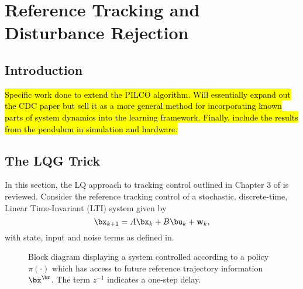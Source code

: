 \chapter{Reference Tracking and Disturbance Rejection}

\section{Introduction}
\hl{Specific work done to extend the PILCO algorithm. Will essentially expand out the CDC paper but sell it as a more general method for incorporating known parts of system dynamics into the learning framework. Finally, include the results from the pendulum in simulation and hardware.}


\section{The LQG Trick}
In this section, the LQ approach to tracking control outlined in Chapter 3 of \cite{BGW90} is reviewed. Consider the reference tracking control of a stochastic, discrete-time, Linear Time-Invariant (LTI) system given by 
\begin{equation}
\bx_{k+1} = A\bx_k + B\bu_k + \mathbf{w}_k,
\end{equation}
with state, input and noise terms as defined in. 

\begin{figure}[] %
\centering

\caption{Block diagram displaying a system controlled according to a policy $\pi(\cdot)$ which has access to future reference trajectory information $\bx^{\br}$. The term $z^{-1}$ indicates a one-step delay.}
\label{figs:lqsetup}
\end{figure} %


